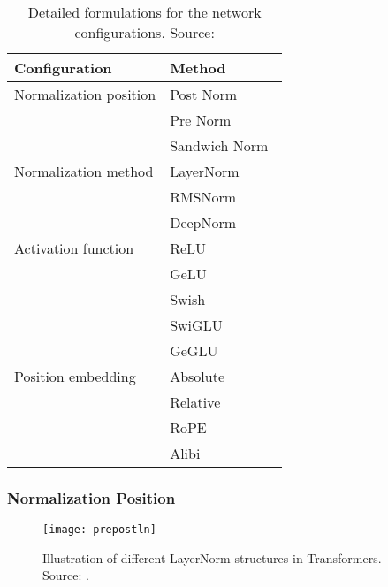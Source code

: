 \begin{table}[htbp]
	\begin{tabularx}{\textwidth}{|X|X|}
		\hline
		\textbf{Configuration} & \textbf{Method}                        \\
		\hline
		Normalization position & Post Norm~\cite{vaswani2023attention}  \\
		                       & Pre Norm~\cite{radford2019language}    \\
		                       & Sandwich Norm~\cite{ding2021cogview}   \\
		Normalization method   & LayerNorm~\cite{ba2016layer}           \\
		                       & RMSNorm~\cite{zhang2019root}           \\
		                       & DeepNorm~\cite{wang2022deepnet}        \\
		Activation function    & ReLU~\cite{nair2010rectified}          \\
		                       & GeLU~\cite{wang2018glue}               \\
		                       & Swish~\cite{ramachandran2017searching} \\
		                       & SwiGLU~\cite{shazeer2020glu}           \\
		                       & GeGLU~\cite{shazeer2020glu}            \\
		Position embedding     & Absolute~\cite{vaswani2023attention}   \\
		                       & Relative~\cite{raffel2023exploring}    \\
		                       & RoPE~\cite{su2021roformer}             \\
		                       & Alibi~\cite{press2022train}            \\
		\hline
	\end{tabularx}
	\caption{Detailed formulations for the network configurations. Source: \textcite{survey}}
	\label{tab:configurations}
\end{table}

\subsubsection{Normalization Position}
\label{subsubsec:normalization-position}

\begin{figure}
	\centering
	\texttt{[image: prepostln]}
	\caption{Illustration of different LayerNorm structures in Transformers. Source: \textcite{ding2021cogview}.}
	\label{fig:prepostln}
\end{figure}

